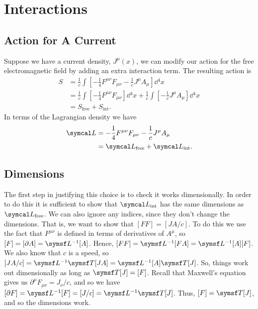 \chapter{Interactions}
\section{Action for A Current}
Suppose we have a current density, \(J^\mu(x)\), we can modify our action for the free electromagnetic field by adding an extra interaction term.
The resulting action is
\begin{align}
    S &= \frac{1}{c} \int \left[ -\frac{1}{4}F^{\mu\nu}F_{\mu\nu} - \frac{1}{c}J^\mu A_\mu \right] \dd{^4x}\\
    &= \frac{1}{c} \int \left[ -\frac{1}{4}F^{\mu\nu}F_{\mu\nu} \right] \dd{^4x} + \frac{1}{c} \int \left[ -\frac{1}{c} J^\mu A_\mu \right] \dd{^4x}\\
    &= S_{\text{free}} + S_{\text{int}}.
\end{align}
In terms of the Lagrangian density we have
\begin{align}
    \lagrangianDensity &= -\frac{1}{4}F^{\mu\nu}F_{\mu\nu} - \frac{1}{c}J^\mu A_\mu\\
    &= \lagrangianDensity_{\text{free}} + \lagrangianDensity_{\text{int}}.
\end{align}

\section{Dimensions}
The first step in justifying this choice is to check it works dimensionally.
In order to do this it is sufficient to show that \(\lagrangianDensity_{\text{int}}\) has the same dimensions as \(\lagrangianDensity_{\text{free}}\).
We can also ignore any indices, since they don't change the dimensions.
That is, we want to show that \([FF] = [JA/c]\).
To do this we use the fact that \(F^{\mu\nu}\) is defined in terms of derivatives of \(A^\mu\), so \([F] = [\partial A] = \dimension{L}^{-1}[A]\).
Hence, \([FF] = \dimension{L}^{-1}[FA] = \dimension{L}^{-1}[A][F]\).
We also know that \(c\) is a speed, so \([JA/c] = \dimension{L}^{-1}\dimension{T}[JA] = \dimension{L}^{-1}[A]\dimension{T}[J]\).
So, things work out dimensionally as long as \(\dimension{T}[J] = [F]\).
Recall that Maxwell's equation gives us \(\partial^\mu F_{\mu\nu} = J_\nu/c\), and so we have \([\partial F] = \dimension{L}^{-1}[F] = [J/c] = \dimension{L}^{-1}\dimension{T}[J]\).
Thus, \([F] = \dimension{T}[J]\), and so the dimensions work.

